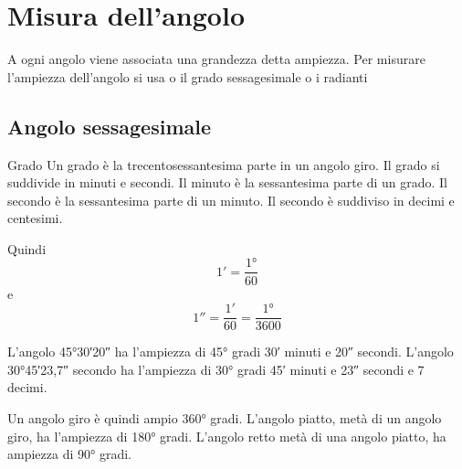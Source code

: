 \section{Misura dell'angolo}
\label{sec:MisuraAngoloGonio}

A ogni angolo viene associata una grandezza detta ampiezza.  Per misurare l'ampiezza dell'angolo si usa o il grado sessagesimale  o i radianti
\subsection{Angolo sessagesimale}
\begin{definizionet}{Grado}{}
Un grado è la trecentosessantesima parte in un angolo giro. Il grado si suddivide in minuti e  secondi. Il minuto è la sessantesima parte di un grado. Il secondo è la sessantesima parte di un minuto. Il secondo è suddiviso in decimi e centesimi.
\end{definizionet}
 Quindi \[\ang{;1;}=\dfrac{\ang{1}}{60}\] e  \[\ang{;;1}=\dfrac{\ang{;1;}}{60}=\dfrac{\ang{1}}{3600}\]
\begin{esempiot}{}{}
L'angolo  \ang{45;30;20}  ha l'ampiezza di \ang{45} gradi \ang{;30;} minuti e \ang{;;20} secondi. L'angolo \ang{30;45;23,7} secondo ha l'ampiezza di \ang{30} gradi \ang{;45;} minuti e \ang{;;23} secondi e $7$ decimi.
\end{esempiot}
Un angolo giro è quindi ampio \ang{360} gradi. L'angolo piatto,  metà di un angolo giro, ha l'ampiezza di \ang{180} gradi. L'angolo retto  metà di una angolo piatto, ha ampiezza di \ang{90} gradi.

